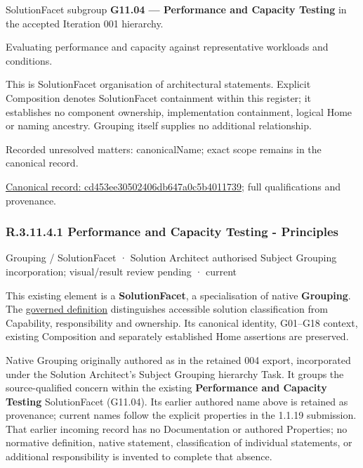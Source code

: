 SolutionFacet subgroup \textbf{G11.04 — Performance and Capacity Testing} in the accepted Iteration 001 hierarchy.



Evaluating performance and capacity against representative workloads and conditions.



This is SolutionFacet organisation of architectural statements. Explicit Composition denotes SolutionFacet containment within this register; it establishes no component ownership, implementation containment, logical Home or naming ancestry. Grouping itself supplies no additional relationship.


{\small Recorded unresolved matters: canonicalName; exact scope remains in the canonical record.}\par
{\footnotesize \href{../../../../../../../continuum/grouping/cd453ee30502406db647a0c5b4011739.md}{Canonical record: cd453ee30502406db647a0c5b4011739}; full qualifications and provenance.}\par
\subsubsection*{R.3.11.4.1 Performance and Capacity Testing - Principles}
\label{navigation:R.3.11.4.1}

\label{element:582e15cf43f94ce6b1c128361ec31780}
{\small Grouping / SolutionFacet · Solution Architect authorised Subject Grouping incorporation; visual/result review pending · current}\par

This existing element is a \textbf{SolutionFacet}, a specialisation of native
\textbf{Grouping}. The \href{\detokenize{../../../../../../../governance/continuum-representation.md#solutionfacet-classification--1119-candidate}}{governed definition}
distinguishes accessible solution classification from Capability, responsibility
and ownership. Its canonical identity, G01–G18 context, existing Composition
and separately established Home assertions are preserved.



Native Grouping originally authored as \texttt{} in the retained 004 export,
incorporated under the Solution Architect's Subject Grouping hierarchy Task.
It groups the source-qualified \texttt{} concern within
the existing \textbf{Performance and Capacity Testing} SolutionFacet (G11.04). Its earlier authored name above is retained as provenance; current names
follow the explicit properties in the 1.1.19 submission.
That earlier incoming record has no Documentation or authored Properties; no normative
definition, native statement, classification of individual statements, or
additional responsibility is invented to complete that absence.



